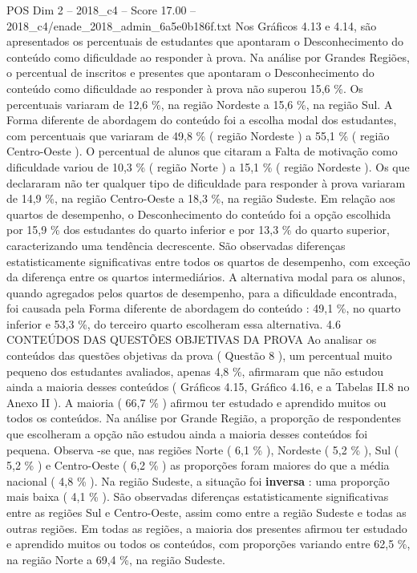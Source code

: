 \begin{textsample}{POS Dim 2 – 2018\_c4 – Score 17.00 – 2018\_c4/enade\_2018\_admin\_6a5e0b186f.txt}
Nos Gráficos 4.13 e 4.14, são apresentados os percentuais de estudantes que apontaram o Desconhecimento do conteúdo como dificuldade ao responder à prova.
Na análise por Grandes Regiões, o percentual de inscritos e presentes que apontaram o Desconhecimento do conteúdo como dificuldade ao responder à prova não superou 15,6 \%.
Os percentuais variaram de 12,6 \%, na região Nordeste a 15,6 \%, na região Sul.
A Forma diferente de abordagem do conteúdo foi a escolha modal dos estudantes, com percentuais que variaram de 49,8 \% ( região Nordeste ) a 55,1 \% ( região Centro-Oeste ).
O percentual de alunos que citaram a Falta de motivação como dificuldade variou de 10,3 \% ( região Norte ) a 15,1 \% ( região Nordeste ).
Os que declararam não ter qualquer tipo de dificuldade para responder à prova variaram de 14,9 \%, na região Centro-Oeste a 18,3 \%, na região Sudeste.
Em relação aos quartos de desempenho, o Desconhecimento do conteúdo foi a opção escolhida por 15,9 \% dos estudantes do quarto inferior e por 13,3 \% do quarto superior, caracterizando uma tendência decrescente.
São observadas diferenças estatisticamente significativas entre todos os quartos de desempenho, com exceção da diferença entre os quartos intermediários.
A alternativa modal para os alunos, quando agregados pelos quartos de desempenho, para a dificuldade encontrada, foi causada pela Forma diferente de abordagem do conteúdo : 49,1 \%, no quarto inferior e 53,3 \%, do terceiro quarto escolheram essa alternativa. 4.6 CONTEÚDOS DAS QUESTÕES OBJETIVAS DA PROVA Ao analisar os conteúdos das questões objetivas da prova ( Questão 8 ), um percentual muito pequeno dos estudantes avaliados, apenas 4,8 \%, afirmaram que não estudou ainda a maioria desses conteúdos ( Gráficos 4.15, Gráfico 4.16, e a Tabelas II.8 no Anexo II ).
A maioria ( 66,7 \% ) afirmou ter estudado e aprendido muitos ou todos os conteúdos.
Na análise por Grande Região, a proporção de respondentes que escolheram a opção não estudou ainda a maioria desses conteúdos foi pequena.
Observa -se que, nas regiões Norte ( 6,1 \% ), Nordeste ( 5,2 \% ), Sul ( 5,2 \% ) e Centro-Oeste ( 6,2 \% ) as proporções foram maiores do que a média nacional ( 4,8 \% ).
Na região Sudeste, a situação foi \textbf{inversa} : uma proporção mais baixa ( 4,1 \% ).
São observadas diferenças estatisticamente significativas entre as regiões Sul e Centro-Oeste, assim como entre a região Sudeste e todas as outras regiões.
Em todas as regiões, a maioria dos presentes afirmou ter estudado e aprendido muitos ou todos os conteúdos, com proporções variando entre 62,5 \%, na região Norte a 69,4 \%, na região Sudeste.

\end{textsample}
